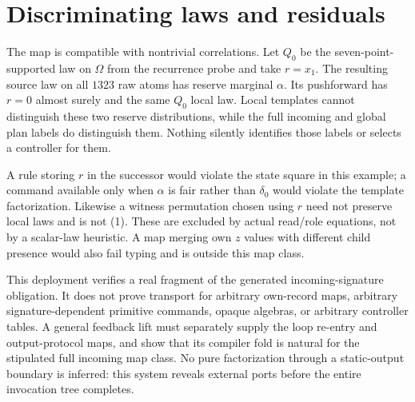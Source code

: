 \documentclass[11pt]{article}
\begin{document}
\section{Discriminating laws and residuals}
The map is compatible with nontrivial correlations. Let $Q_0$ be the seven-point-supported law on $\Omega$ from the recurrence probe and take $r=x_1$. The resulting source law on all $1323$ raw atoms has reserve marginal $\alpha$. Its pushforward has $r=0$ almost surely and the same $Q_0$ local law. Local templates cannot distinguish these two reserve distributions, while the full incoming and global plan labels do distinguish them. Nothing silently identifies those labels or selects a controller for them.

A rule storing $r$ in the successor would violate the state square in this example; a command available only when $\alpha$ is fair rather than $\delta_0$ would violate the template factorization. Likewise a witness permutation chosen using $r$ need not preserve local laws and is not (1). These are excluded by actual read/role equations, not by a scalar-law heuristic. A map merging own $z$ values with different child presence would also fail typing and is outside this map class.

This deployment verifies a real fragment of the generated incoming-signature obligation. It does not prove transport for arbitrary own-record maps, arbitrary signature-dependent primitive commands, opaque algebras, or arbitrary controller tables. A general feedback lift must separately supply the loop re-entry and output-protocol maps, and show that its compiler fold is natural for the stipulated full incoming map class. No pure factorization through a static-output boundary is inferred: this system reveals external ports before the entire invocation tree completes.
\end{document}
